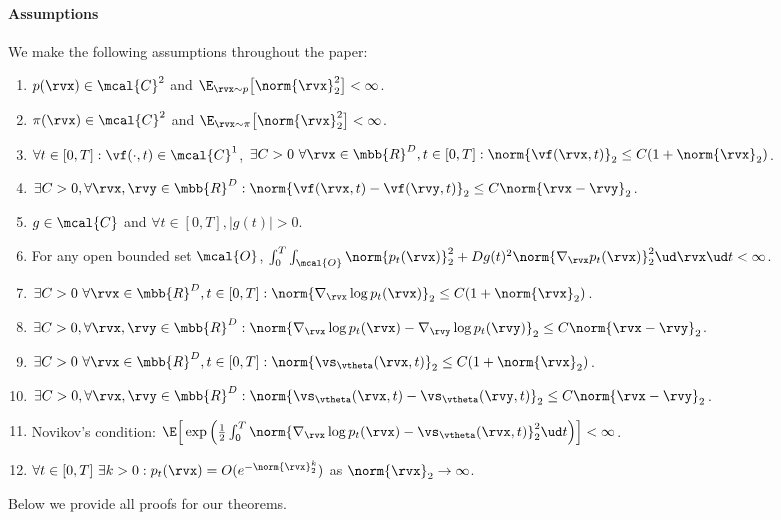 \paragraph{Assumptions}
We make the following assumptions throughout the paper:
\begin{enumerate}[label=(\roman*)]
    \item $p(\rvx) \in \mcal{C}^2$ and $\E_{\rvx \sim p}\big[\norm{\rvx}_2^2\big] < \infty$.
    \item $\pi(\rvx) \in \mcal{C}^2$ and $\E_{\rvx \sim \pi}\big[ \norm{\rvx}_2^2 \big] < \infty$.
    \item $\forall t\in[0,T]: \vf(\cdot, t) \in \mcal{C}^1$, $\exists C>0~\forall \rvx \in \mbb{R}^D, t\in [0,T]: \norm{\vf(\rvx, t)}_2 \leq C(1 + \norm{\rvx}_2)$.
    \item $\exists C>0, \forall \rvx, \rvy \in \mbb{R}^D: \norm{\vf(\rvx, t) - \vf(\rvy, t)}_2 \leq C \norm{\rvx - \rvy}_2$.
    \item $g \in \mcal{C}$ and $\forall t\in[0,T], |g(t)| > 0$.
    \item For any open bounded set $\mcal{O}$, $\int_0^T \int_\mcal{O} \norm{p_t(\rvx)}_2^2 + D g(t)^2 \norm{\nabla_\rvx p_t(\rvx)}_2^2 \ud \rvx \ud t < \infty$.
    \item $\exists C>0~\forall \rvx \in \mbb{R}^D, t \in [0,T]: \norm{\nabla_\rvx \log p_t(\rvx)}_2 \leq C(1 + \norm{\rvx}_2)$.
    \item $\exists C>0, \forall \rvx, \rvy \in \mbb{R}^D: \norm{\nabla_\rvx \log p_t(\rvx) - \nabla_\rvy \log p_t(\rvy)}_2 \leq C \norm{\rvx - \rvy}_2$.
    \item $\exists C>0~\forall \rvx \in \mbb{R}^D, t \in [0,T]: \norm{\vs_\vtheta(\rvx, t)}_2 \leq C(1 + \norm{\rvx}_2)$.
    \item $\exists C>0, \forall \rvx, \rvy \in \mbb{R}^D: \norm{\vs_\vtheta(\rvx, t) - \vs_\vtheta(\rvy, t)}_2 \leq C \norm{\rvx - \rvy}_2$.
    \item Novikov's condition: $\E\Big[ \exp\Big( \frac{1}{2}\int_0^T \norm{\nabla_\rvx \log p_t(\rvx) - \vs_\vtheta(\rvx, t)}_2^2 \ud t \Big) \Big] < \infty$.
    \item $\forall t \in [0,T]~\exists k > 0: p_t(\rvx) = O(e^{-\norm{\rvx}_2^k})$ as $\norm{\rvx}_2 \to \infty$.
\end{enumerate}
Below we provide all proofs for our theorems.
\bound*
